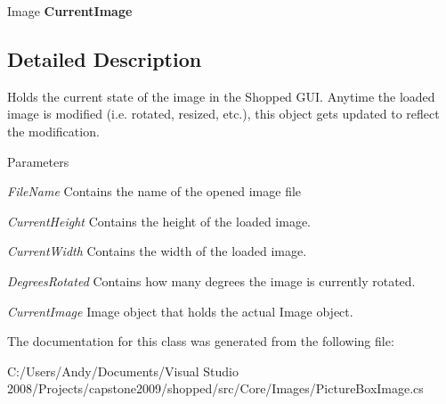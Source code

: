 \begin{DoxyCompactItemize}
\item 
\hypertarget{class_core_1_1_images_1_1_picture_box_image_aee6569c4f810e2e90caa9417475ac62a}{
Image {\bfseries CurrentImage}}
\label{class_core_1_1_images_1_1_picture_box_image_aee6569c4f810e2e90caa9417475ac62a}

\end{DoxyCompactItemize}


\subsection{Detailed Description}
Holds the current state of the image in the Shopped GUI. Anytime the loaded image is modified (i.e. rotated, resized, etc.), this object gets updated to reflect the modification.


\begin{DoxyParams}{Parameters}
\item[{\em FileName}]Contains the name of the opened image file \item[{\em CurrentHeight}]Contains the height of the loaded image. \item[{\em CurrentWidth}]Contains the width of the loaded image. \item[{\em DegreesRotated}]Contains how many degrees the image is currently rotated. \item[{\em CurrentImage}]Image object that holds the actual Image object. \end{DoxyParams}


The documentation for this class was generated from the following file:\begin{DoxyCompactItemize}
\item 
C:/Users/Andy/Documents/Visual Studio 2008/Projects/capstone2009/shopped/src/Core/Images/PictureBoxImage.cs\end{DoxyCompactItemize}

